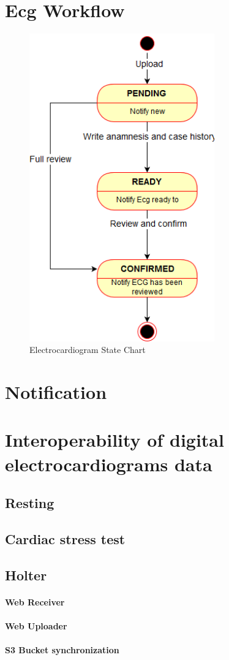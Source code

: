 \section{Ecg Workflow}
\begin{figure}[h]
    \includegraphics[width=8cm]{ECGstatechart}
    \caption{Electrocardiogram State Chart}
    \label{fig:ECGstatechart}
\end{figure}
\section{Notification}
\section{Interoperability of digital electrocardiograms data}
\subsection{Resting}
\subsection{Cardiac stress test}
\subsection{Holter}
\paragraph{Web Receiver}
\paragraph{Web Uploader}
\paragraph{S3 Bucket synchronization}